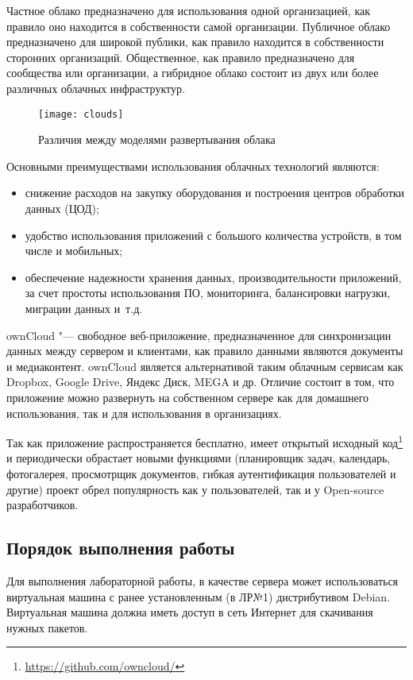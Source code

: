 \clearpage

Частное облако предназначено для использования одной организацией, как правило оно находится в собственности самой организации.
Публичное облако предназначено для широкой публики, как правило находится в собственности сторонних организаций.
Общественное, как правило предназначено для сообщества или организации, а гибридное облако состоит из двух или более различных облачных инфраструктур.

\begin{figure}[ht]
    \centering
	\texttt{[image: clouds]}
	\caption{Различия между моделями развертывания облака}\label{pic:clouds}
\end{figure}

Основными преимуществами использования облачных технологий являются:
\begin{itemize}
    \item снижение расходов на закупку оборудования и построения центров обработки данных (ЦОД);
    \item удобство использования приложений с большого количества устройств, в том числе и мобильных;
    \item обеспечение надежности хранения данных, производительности приложений, за счет простоты использования ПО, мониторинга, балансировки нагрузки, миграции данных и~т.д.
\end{itemize}

ownCloud "--- свободное веб-приложение, предназначенное для синхронизации данных между сервером и клиентами, как правило данными являются документы и медиаконтент.
ownCloud является альтернативой таким облачным сервисам как Dropbox, Google Drive, Яндекс Диск, MEGA и др.
Отличие состоит в том, что приложение можно развернуть на собственном сервере как для домашнего использования, так и для использования в организациях.

Так как приложение распространяется бесплатно, имеет открытый исходный код\footnote{\url{https://github.com/owncloud/}} и периодически обрастает новыми функциями (планировщик задач, календарь, фотогалерея, просмотрщик документов, гибкая аутентификация пользователей и другие) проект обрел популярность как у пользователей, так и у Open-source разработчиков.

\subsection{Порядок выполнения работы}

Для выполнения лабораторной работы, в качестве сервера может использоваться виртуальная машина с ранее установленным (в ЛР№1) дистрибутивом Debian.
Виртуальная машина должна иметь доступ в сеть Интернет для скачивания нужных пакетов.

